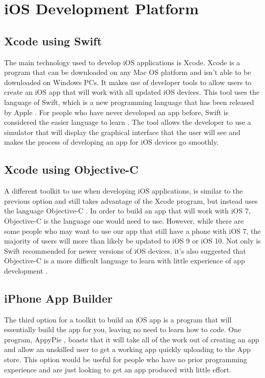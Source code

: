 \documentclass[letterpaper,10pt,draftclsnofoot,onecolumn,titlepage]{IEEEtran}
\begin{document}
	 
	\section{iOS Development Platform}
	\subsection{Xcode using Swift}
	The main technology used to develop iOS applications is Xcode. 
	Xcode is a program that can be downloaded on any Mac OS platform and isn't able to be downloaded on Windows PCs.
	It makes use of developer tools to allow users to create an iOS app that will work with all updated iOS devices. 
	This tool uses the language of Swift, which is a new programming language that has been released by Apple \cite{AppleSwift}. 
	For people who have never developed an app before, Swift is considered the easier language to learn \cite{CodeChris}. 
	The tool allows the developer to use a simulator that will display the graphical interface that the user will see and makes the process of developing an app for iOS devices go smoothly. 
	
	\subsection{Xcode using Objective-C}
	A different toolkit to use when developing iOS applications, is similar to the previous option and still takes advantage of the Xcode program, but instead uses the language Objective-C \cite{AppleObjC}. 
	In order to build an app that will work with iOS 7, Objective-C is the language one would need to use. 
	However, while there are some people who may want to use our app that still have a phone with iOS 7, the majority of users will more than likely be updated to iOS 9 or iOS 10. 
	Not only is Swift recommended for newer versions of iOS devices, it's also suggested that Objective-C is a more difficult language to learn with little experience of app development \cite{CodeChris}. 
	\subsection{iPhone App Builder}
	The third option for a toolkit to build an iOS app is a program that will essentially build the app for you, leaving no need to learn how to code. 
	One program, AppyPie \cite{AppyPie}, boasts that it will take all of the work out of creating an app and allow an unskilled user to get a working app quickly uploading to the App store.
	This option would be useful for people who have no prior programming experience and are just looking to get an app produced with little effort. 
\end{document}

